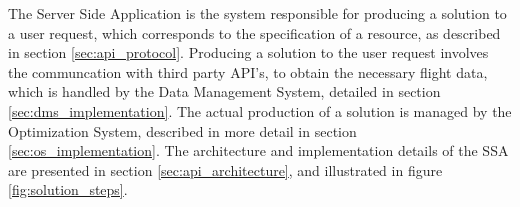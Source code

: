 The Server Side Application is the system responsible for producing a solution to a user request,
which corresponds to the specification of a resource, as described in section \ref{sec:api_protocol}.
Producing a solution to the user request involves the communcation with third party API's,
to obtain the necessary flight data, which is handled by the Data Management System,
detailed in section \ref{sec:dms_implementation}.
The actual production of a solution is managed by the Optimization System,
described in more detail in section \ref{sec:os_implementation}.
The architecture and implementation details of the SSA are 
presented in section \ref{sec:api_architecture},
and illustrated in figure \ref{fig:solution_steps}.


